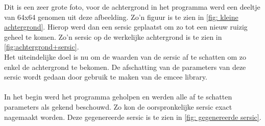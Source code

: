 Dit is een zeer grote foto, voor de achtergrond in het programma werd een deeltje van 64x64 genomen uit deze afbeelding. Zo'n figuur is te zien in \cref{fig: kleine achtergrond}.
Hierop werd dan een sersic geplaatst om zo tot een nieuw ruizig geheel te komen. Zo'n sersic op de werkelijke achtergrond is te zien in \cref{fig:achtergrond+sersic}.
\\
Het uiteindelijke doel is nu om de waarden van de sersic af te schatten om zo enkel de achtergrond te bekomen. De afschatting van de parameters van deze sersic wordt gedaan door gebruik te maken van de emcee library.
\\ \\
In het begin werd het programma geholpen en werden alle af te schatten parameters als gekend beschouwd. Zo kon de oorspronkelijke sersic exact nagemaakt worden. Deze gegenereerde sersic is te zien in \cref{fig: gegenereerde sersic}. 
